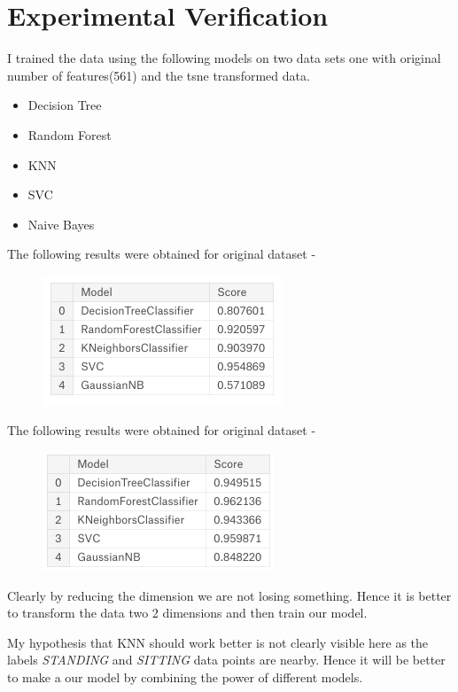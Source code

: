 \documentclass[12pt]{article}
\begin{document}
\section{Experimental Verification}
I trained the data using the following models on two data sets one with original number of features(561) and the tsne transformed data.
\begin{itemize}
	\item Decision Tree
	\item Random Forest
	\item KNN
	\item SVC
	\item Naive Bayes
\end{itemize}
The following results were obtained for original dataset - \\
	\begin{figure}[H]
			\centering
			\includegraphics[scale=0.75]{model1.png}
		\end{figure}
\vspace{0.5cm}		
\noindent
The following results were obtained for original dataset - \\
	\begin{figure}[H]
			\centering
			\includegraphics[scale=0.75]{model2.png}
		\end{figure}
\vspace{0.5cm}
Clearly by reducing the dimension we are not losing something. Hence it is better to transform the data two 2 dimensions and then train our model.

My hypothesis that KNN should work better is not clearly visible here as the labels \textit{STANDING} and \textit{SITTING} data points are nearby. Hence it will be better to make a our model by combining the power of different models.
\end{document}
